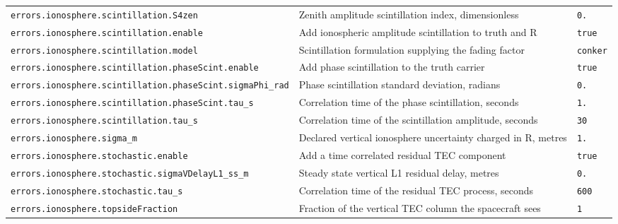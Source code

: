 \begin{center}
\begin{longtable}{>{\raggedright\arraybackslash\scriptsize\ttfamily}p{}|>{\raggedright\arraybackslash}p{}|>{\raggedright\arraybackslash\scriptsize\ttfamily}p{}}
\texttt{errors.\allowbreak ionosphere.\allowbreak scintillation.\allowbreak S4zen} & Zenith amplitude scintillation index, dimensionless & \texttt{0.\allowbreak 3} \\
\texttt{errors.\allowbreak ionosphere.\allowbreak scintillation.\allowbreak enable} & Add ionospheric amplitude scintillation to truth and R & \texttt{true} \\
\texttt{errors.\allowbreak ionosphere.\allowbreak scintillation.\allowbreak model} & Scintillation formulation supplying the fading factor & \texttt{conker} \\
\texttt{errors.\allowbreak ionosphere.\allowbreak scintillation.\allowbreak phase\allowbreak Scint.\allowbreak enable} & Add phase scintillation to the truth carrier & \texttt{true} \\
\texttt{errors.\allowbreak ionosphere.\allowbreak scintillation.\allowbreak phase\allowbreak Scint.\allowbreak sigma\allowbreak Phi\_\allowbreak rad} & Phase scintillation standard deviation, radians & \texttt{0.\allowbreak 2} \\
\texttt{errors.\allowbreak ionosphere.\allowbreak scintillation.\allowbreak phase\allowbreak Scint.\allowbreak tau\_\allowbreak s} & Correlation time of the phase scintillation, seconds & \texttt{1.\allowbreak 5} \\
\texttt{errors.\allowbreak ionosphere.\allowbreak scintillation.\allowbreak tau\_\allowbreak s} & Correlation time of the scintillation amplitude, seconds & \texttt{30} \\
\texttt{errors.\allowbreak ionosphere.\allowbreak sigma\_\allowbreak m} & Declared vertical ionosphere uncertainty charged in R, metres & \texttt{1.\allowbreak 0} \\
\texttt{errors.\allowbreak ionosphere.\allowbreak stochastic.\allowbreak enable} & Add a time correlated residual TEC component & \texttt{true} \\
\texttt{errors.\allowbreak ionosphere.\allowbreak stochastic.\allowbreak sigma\allowbreak VDelay\allowbreak L1\_\allowbreak ss\_\allowbreak m} & Steady state vertical L1 residual delay, metres & \texttt{0.\allowbreak 3} \\
\texttt{errors.\allowbreak ionosphere.\allowbreak stochastic.\allowbreak tau\_\allowbreak s} & Correlation time of the residual TEC process, seconds & \texttt{600} \\
\texttt{errors.\allowbreak ionosphere.\allowbreak topside\allowbreak Fraction} & Fraction of the vertical TEC column the spacecraft sees & \texttt{1} \\

\end{longtable}
\end{center}
